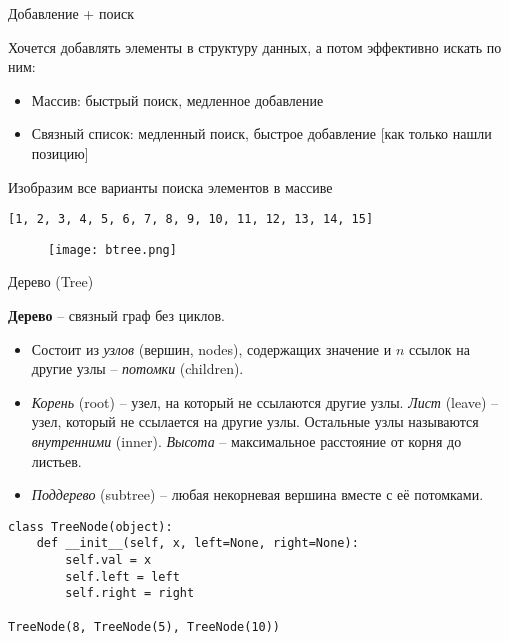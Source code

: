 \begin{frame}[fragile]{Добавление + поиск}

Хочется добавлять элементы в структуру данных, а потом эффективно искать по ним:

\begin{itemize}
  \item Массив: быстрый поиск, медленное добавление
  \item Связный список: медленный поиск, быстрое добавление [как только нашли позицию]
\end{itemize}

Изобразим все варианты поиска элементов в массиве

\texttt{[1, 2, 3, 4, 5, 6, 7, 8, 9, 10, 11, 12, 13, 14, 15]}

\begin{figure}
  \centering
  \texttt{[image: btree.png]}
\end{figure}

\end{frame}



\begin{frame}[fragile]{Дерево (Tree)}

{\bf Дерево} --  связный граф без циклов.

\begin{itemize}
  \item Состоит из {\em узлов} (вершин, nodes), содержащих значение и $n$ ссылок на другие узлы -- {\em потомки} (children).
  \item {\em Корень} (root) -- узел, на который не ссылаются другие узлы. {\em Лист} (leave) -- узел, который не ссылается на другие узлы. Остальные узлы называются {\em внутренними} (inner). {\em Высота} -- максимальное расстояние от корня до листьев.
  \item {\em Поддерево} (subtree) -- любая некорневая вершина вместе с её потомками.
\end{itemize}

\begin{verbatim}
class TreeNode(object):
    def __init__(self, x, left=None, right=None):
        self.val = x
        self.left = left
        self.right = right

TreeNode(8, TreeNode(5), TreeNode(10))
\end{verbatim}


\end{frame}

